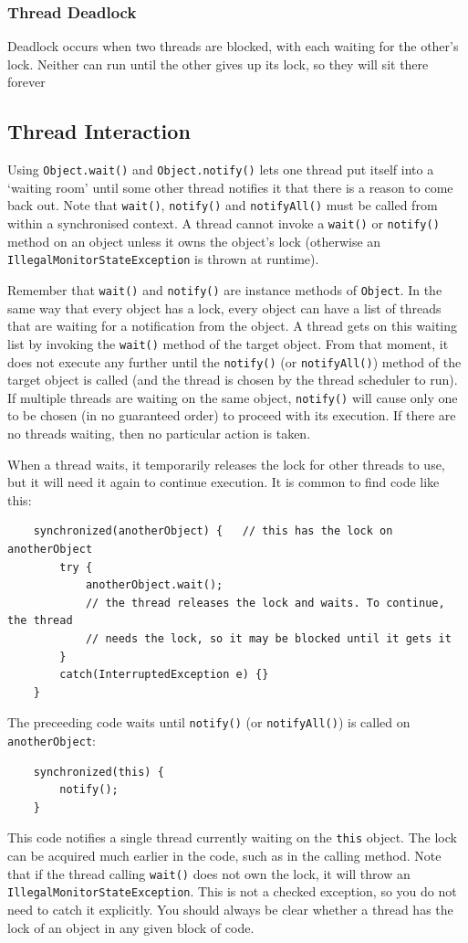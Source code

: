 \subsubsection{Thread Deadlock}
Deadlock occurs when two threads are blocked, with each waiting for the other's 
lock. Neither can run until the other gives up its lock, so they will sit there 
forever

\subsection{Thread Interaction}
Using \verb#Object.wait()# and \verb#Object.notify()# lets one thread put 
itself into a `waiting room' until some other thread notifies it that there is 
a reason to come back out. Note that \verb#wait()#, \verb#notify()# and 
\verb#notifyAll()# must be called from within a synchronised context. A thread 
cannot invoke a \verb#wait()# or \verb#notify()# method on an object unless it 
owns the object's lock (otherwise an \verb#IllegalMonitorStateException# is 
thrown at runtime).

Remember that \verb#wait()# and \verb#notify()# are instance methods of 
\verb#Object#. In the same way that every object has a lock, every object can 
have a list of threads that are waiting for a notification from the object. A 
thread gets on this waiting list by invoking the \verb#wait()# method of the 
target object. From that moment, it does not execute any further until the 
\verb#notify()# (or \verb#notifyAll()#) method of the target object is called 
(and the thread is chosen by the thread scheduler to run). If multiple threads 
are waiting on the same object, \verb#notify()# will cause only one to be 
chosen (in no guaranteed order) to proceed with its execution. If there are no 
threads waiting, then no particular action is taken.

When a thread waits, it temporarily releases the lock for other threads to use, 
but it will need it again to continue execution. It is common to find code like 
this:
\begin{verbatim}
    synchronized(anotherObject) {   // this has the lock on anotherObject
        try {
            anotherObject.wait();
            // the thread releases the lock and waits. To continue, the thread 
            // needs the lock, so it may be blocked until it gets it
        }
        catch(InterruptedException e) {}
    }
\end{verbatim}
The preceeding code waits until \verb#notify()# (or \verb#notifyAll()#) is 
called on \verb#anotherObject#:
\begin{verbatim}
    synchronized(this) {
        notify();
    }
\end{verbatim}
This code notifies a single thread currently waiting on the \verb#this# object.
The lock can be acquired much earlier in the code, such as in the calling 
method. Note that if the thread calling \verb#wait()# does not own the lock, it 
will throw an \verb#IllegalMonitorStateException#. This is not a checked 
exception, so you do not need to catch it explicitly. You should always be 
clear whether a thread has the lock of an object in any given block of code.

